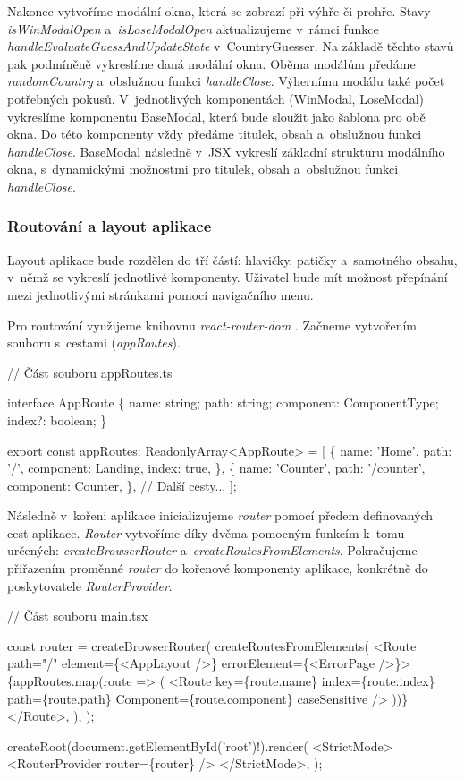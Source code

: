 Nakonec vytvoříme modální okna, která se zobrazí při výhře či prohře. Stavy \emph{isWinModalOpen} a~\emph{isLoseModalOpen} aktualizujeme v~rámci funkce \emph{handleEvaluateGuessAndUpdateState} v~CountryGuesser. 
Na základě těchto stavů pak podmíněně vykreslíme daná modální okna. Oběma modálům předáme \emph{randomCountry} a~obslužnou funkci \emph{handleClose}. Výhernímu modálu také počet potřebných pokusů. 
V~jednotlivých komponentách (WinModal, LoseModal) vykreslíme komponentu BaseModal, která bude sloužit jako šablona pro obě okna. Do této komponenty vždy předáme titulek, obsah a~obslužnou funkci \emph{handleClose}. 
BaseModal následně v~JSX vykreslí základní strukturu modálního okna, s~dynamickými možnostmi pro titulek, obsah a~obslužnou funkci \emph{handleClose}.

\subsubsection*{Routování a layout aplikace}

Layout aplikace bude rozdělen do tří částí: hlavičky, patičky a~samotného obsahu, v~němž se vykreslí jednotlivé komponenty. Uživatel bude mít možnost přepínání mezi jednotlivými stránkami pomocí navigačního menu.

Pro routování využijeme knihovnu \emph{react-router-dom} \cite{reactrouter}. Začneme vytvořením souboru s~cestami (\emph{appRoutes}).

\begin{prog}
// Část souboru appRoutes.ts

interface AppRoute \{
  name: string;
  path: string;
  component: ComponentType;
  index?: boolean;
\}

export const appRoutes: ReadonlyArray<AppRoute> = [
  \{
    name: 'Home',
    path: '/',
    component: Landing,
    index: true,
  \},
  \{
    name: 'Counter',
    path: '/counter',
    component: Counter,
  \},
  // Další cesty...
];
\end{prog}

Následně v~kořeni aplikace inicializujeme \emph{router} pomocí předem definovaných cest aplikace. 
\emph{Router} vytvoříme díky dvěma pomocným funkcím k~tomu určených: \emph{createBrowserRouter} a~\emph{createRoutesFromElements}. 
Pokračujeme přiřazením proměnné \emph{router} do kořenové komponenty aplikace, konkrétně do poskytovatele \emph{RouterProvider}.

\begin{prog}
// Část souboru main.tsx

const router = createBrowserRouter(
  createRoutesFromElements(
    <Route path="/" element=\{<AppLayout />\} errorElement=\{<ErrorPage />\}>
      \{appRoutes.map(route => (
        <Route
          key=\{route.name\}
          index=\{route.index\}
          path=\{route.path\}
          Component=\{route.component\}
          caseSensitive
        />
      ))\}
    </Route>,
  ),
);

createRoot(document.getElementById('root')!).render(
  <StrictMode>
    <RouterProvider router=\{router\} />
  </StrictMode>,
);
\end{prog}


